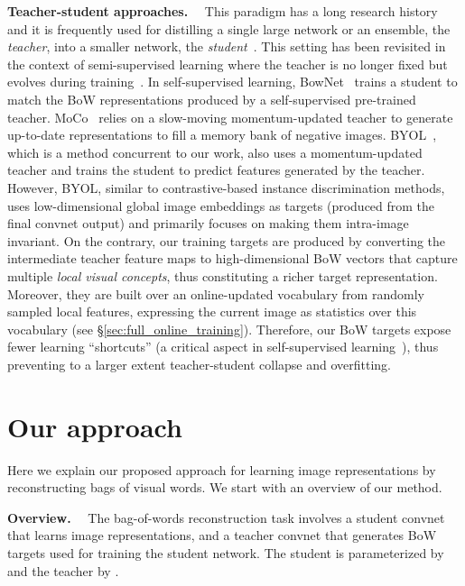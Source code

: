 \documentclass[final]{cvpr}
\newcommand{\parag}[1]{\smallskip\noindent\textbf{#1}~~}
\begin{document}
\parag{Teacher-student approaches.} 
This paradigm has a long research history~\cite{gardner1989three, saad1996dynamics} and it is frequently used for distilling a single large network or an ensemble, the \emph{teacher}, into a smaller network, the \emph{student}~\cite{bucila2006model, hinton2015distilling, korattikara2015bayesian, papamakarios2015distilling}.
This setting has been revisited in the context of semi-supervised learning where the teacher is no longer fixed but evolves during training~\cite{laine2017temporal, tarvainen2017mean, verma2019interpolation}. In self-supervised learning, BowNet~\cite{gidaris2020learning} trains a student to match the BoW representations produced by a self-supervised pre-trained teacher. MoCo~\cite{he2020momentum} relies on a slow-moving momentum-updated teacher to generate up-to-date representations to fill a memory bank of negative images. BYOL~\cite{grill2020bootstrap}, which is a method concurrent to our work, also uses a momentum-updated teacher and trains the student to predict features generated by the teacher.
However, BYOL, similar to contrastive-based instance discrimination methods, uses low-dimensional global image embeddings as targets (produced from the final convnet output) and primarily focuses on making them intra-image invariant.
On the contrary, our training targets are produced by converting the intermediate teacher feature maps to high-dimensional BoW vectors that capture multiple \emph{local visual concepts}, thus constituting a richer target representation.
Moreover, they are built over an online-updated vocabulary from randomly sampled local features, expressing the current image as statistics over this vocabulary (see \S\ref{sec:full_online_training}). 
Therefore, our BoW targets expose fewer learning ``shortcuts'' (a critical aspect in self-supervised learning~\cite{arandjelovic2017look, doersch2015unsupervised, noroozi2016unsupervised, wei2018learning}), thus preventing to a larger extent teacher-student collapse and overfitting. \section{Our approach}

Here we explain our proposed approach for learning image representations by reconstructing bags of visual words. 
We start with an overview of our method.

\parag{Overview.}
The bag-of-words reconstruction task involves a student convnet  that learns image representations, and a teacher convnet  that generates BoW targets used for training the student network. 
The student  is parameterized by  and the teacher  by .
\end{document}
